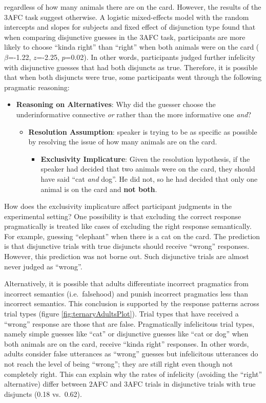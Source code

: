 \documentclass[oneside]{report}
\theoremstyle{definition}
\theoremstyle{definition}
\theoremstyle{definition}
\theoremstyle{remark}
\begin{document}
regardless of how many animals there are on the card. However, the
results of the 3AFC task suggest otherwise. A logistic mixed-effects
model with the random intercepts and slopes for subjects and fixed
effect of disjunction type found that when comparing disjunctive guesses
in the 3AFC task, participants are more likely to choose ``kinda right''
than ``right'' when both animals were on the card (\(\beta\)=-1.22,
\(z\)=-2.25, \(p\)=0.02). In other words, participants judged further
infelicity with disjunctive guesses that had both disjuncts as true.
Therefore, it is possible that when both disjuncts were true, some
participants went through the following pragmatic reasoning:
\begin{itemize}
\tightlist
\item
  \textbf{Reasoning on Alternatives}: Why did the guesser choose the
  underinformative connective \emph{or} rather than the more informative
  one \emph{and}?
  \begin{itemize}
  \tightlist
  \item
    \textbf{Resolution Assumption}: speaker is trying to be as specific
    as possible by resolving the issue of how many animals are on the
    card.
    \begin{itemize}
    \tightlist
    \item
      \textbf{Exclusivity Implicature}: Given the resolution hypothesis,
      if the speaker had decided that two animals were on the card, they
      should have said ``cat \emph{and} dog''. He did not, so he had
      decided that only one animal is on the card and \textbf{not both}.
    \end{itemize}
  \end{itemize}
\end{itemize}
How does the exclusivity implicature affect participant judgments in the
experimental setting? One possibility is that excluding the correct
response pragmatically is treated like cases of excluding the right
response semantically. For example, guessing ``elephant'' when there is
a cat on the card. The prediction is that disjunctive trials with true
disjuncts should receive ``wrong'' responses. However, this prediction
was not borne out. Such disjunctive trials are almost never judged as
``wrong''.

Alternatively, it is possible that adults differentiate incorrect
pragmatics from incorrect semantics (i.e.~falsehood) and punish
incorrect pragmatics less than incorrect semantics. This conclusion is
supported by the response patterns across trial types (figure
\ref{fig:ternaryAdultsPlot}). Trial types that have received a ``wrong''
response are those that are false. Pragmatically infelicitous trial
types, namely simple guesses like ``cat'' or disjunctive guesses like
``cat or dog'' when both animals are on the card, receive ``kinda
right'' responses. In other words, adults consider false utterances as
``wrong'' guesses but infelicitous utterances do not reach the level of
being ``wrong''; they are still right even though not completely right.
This can explain why the rates of infelicity (avoiding the ``right''
alternative) differ between 2AFC and 3AFC trials in disjunctive trials
with true disjuncts (0.18 vs.~0.62).
\end{document}
